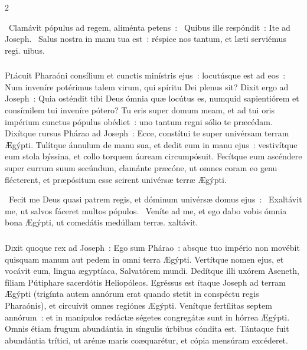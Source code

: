 \documentclass[9pt,twoside]{extarticle}
\begin{document}
\begin{multicols}{2}
{\begin{tightlist}{}
\item {}~Clamávit pópulus ad regem, aliménta petens~: \textred{*}~Quibus ille respóndit~: Ite ad Joseph. ~Salus nostra in manu tua est~: réspice nos tantum, et læti serviémus regi. uibus.
\end{tightlist}

\subsubsection*{\center {}}
\lettrine{P}lácuit Pharaóni consílium et cunctis minístris ejus~:
locutúsque est ad eos~: Num inveníre potérimus talem virum, qui spíritu Dei plenus sit?
Dixit ergo ad Joseph~: Quia osténdit tibi Deus ómnia quæ locútus es, numquid sapientiórem et consímilem tui inveníre pótero?
Tu eris super domum meam, et ad tui oris impérium cunctus pópulus obédiet~: uno tantum regni sólio te præcédam.
Dixítque rursus Phárao ad Joseph~: Ecce, constítui te super univérsam terram Ægýpti.
Tulítque ánnulum de manu sua, et dedit eum in manu ejus~: vestivítque eum stola býssina, et collo torquem áuream circumpósuit.
Fecítque eum ascéndere super currum suum secúndum, clamánte præcóne, ut omnes coram eo genu flécterent, et præpósitum esse scirent univérsæ terræ Ægýpti.

\begin{tightlist}{}
\item {}~Fecit me Deus quasi patrem regis, et dóminum univérsæ domus ejus~: \textred{*}~Exaltávit me, ut salvos fáceret multos pópulos. ~Veníte ad me, et ego dabo vobis ómnia bona Ægýpti, ut comedátis medúllam terræ. xaltávit.
\end{tightlist}

\subsubsection*{\center {}}
\lettrine{D}ixit quoque rex ad Joseph~: Ego sum Phárao~: absque tuo império non movébit quisquam manum aut pedem in omni terra Ægýpti.
Vertítque nomen ejus, et vocávit eum, lingua ægyptíaca, Salvatórem mundi. Dedítque illi uxórem Aseneth, fíliam Pútiphare sacerdótis Heliopóleos. Egréssus est ítaque Joseph ad terram Ægýpti
(trigínta autem annórum erat quando stetit in conspéctu regis Pharaónis), et circuívit omnes regiónes Ægýpti.
Venítque fertílitas septem annórum~: et in manípulos redáctæ ségetes congregátæ sunt in hórrea Ægýpti.
Omnis étiam frugum abundántia in síngulis úrbibus cóndita est.
Tántaque fuit abundántia trítici, ut arénæ maris coæquarétur, et cópia mensúram excéderet.

}
\end{multicols}
\end{document}
